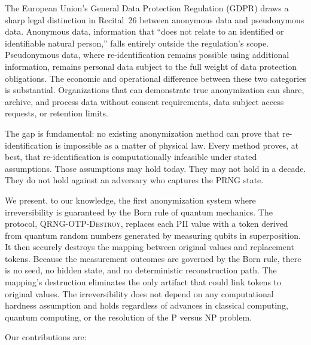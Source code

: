 \documentclass[journal]{IEEEtran}
\begin{document}
The European Union's General Data Protection Regulation (GDPR) draws a sharp legal distinction in Recital~26 between anonymous data and pseudonymous data. Anonymous data, information that ``does not relate to an identified or identifiable natural person,'' falls entirely outside the regulation's scope. Pseudonymous data, where re-identification remains possible using additional information, remains personal data subject to the full weight of data protection obligations. The economic and operational difference between these two categories is substantial. Organizations that can demonstrate true anonymization can share, archive, and process data without consent requirements, data subject access requests, or retention limits.

The gap is fundamental: no existing anonymization method can prove that re-identification is impossible as a matter of physical law. Every method proves, at best, that re-identification is computationally infeasible under stated assumptions. Those assumptions may hold today. They may not hold in a decade. They do not hold against an adversary who captures the PRNG state.

We present, to our knowledge, the first anonymization system where irreversibility is guaranteed by the Born rule of quantum mechanics. The protocol, \textsc{QRNG-OTP-Destroy}, replaces each PII value with a token derived from quantum random numbers generated by measuring qubits in superposition. It then securely destroys the mapping between original values and replacement tokens. Because the measurement outcomes are governed by the Born rule, there is no seed, no hidden state, and no deterministic reconstruction path. The mapping's destruction eliminates the only artifact that could link tokens to original values. The irreversibility does not depend on any computational hardness assumption and holds regardless of advances in classical computing, quantum computing, or the resolution of the P versus NP problem.

Our contributions are:
\end{document}
